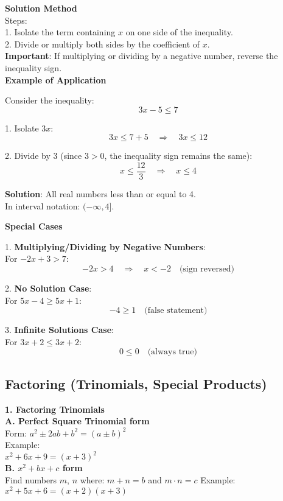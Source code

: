\documentclass{article} %
\begin{document}
\textbf{Solution Method}\\
Steps:\\
1. Isolate the term containing $x$ on one side of the inequality.\\

2. Divide or multiply both sides by the coefficient of $x$.\\
   \textbf{Important}: If multiplying or dividing by a negative number, reverse the inequality sign.\\

\textbf{Example of Application}

Consider the inequality:
\[
3x - 5 \leq 7
\]

1. Isolate $3x$:
\[
3x \leq 7 + 5 \quad \Rightarrow \quad 3x \leq 12
\]

2. Divide by 3 (since $3 > 0$, the inequality sign remains the same):
\[
x \leq \frac{12}{3} \quad \Rightarrow \quad x \leq 4
\]

\textbf{Solution}: All real numbers less than or equal to 4.\\
In interval notation: $(-\infty, 4]$.

\textbf{Special Cases}

1. \textbf{Multiplying/Dividing by Negative Numbers}:\\
For $-2x + 3 > 7$:
\[
-2x > 4 \quad \Rightarrow \quad x < -2 \quad \text{(sign reversed)}
\]

2. \textbf{No Solution Case}:\\
For $5x - 4 \geq 5x + 1$:
\[
-4 \geq 1 \quad \text{(false statement)}
\]

3. \textbf{Infinite Solutions Case}:\\
For $3x + 2 \leq 3x + 2$:
\[
0 \leq 0 \quad \text{(always true)}
\]
\subsection{Factoring (Trinomials, Special Products)}

\textbf{1. Factoring Trinomials}\\  
\textbf{A. Perfect Square Trinomial form}\\  
Form: $a^2 \pm 2ab + b^2 = (a \pm b)^2$\\  
Example:\\  
$x^2 + 6x + 9 = (x + 3)^2$\\  

\noindent\textbf{B. $x^2 + bx + c$ form}\\  
Find numbers $m$, $n$ where:  
$m + n = b$ and $m \cdot n = c$  
Example:  
$x^2 + 5x + 6 = (x + 2)(x + 3)$\\  
\end{document}
